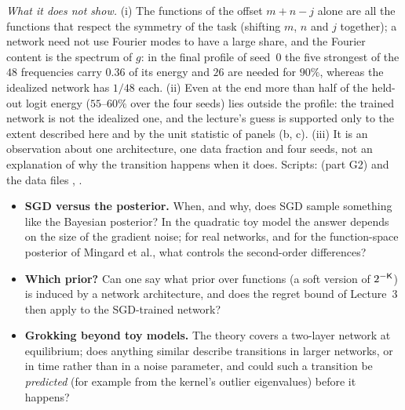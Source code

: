 \begin{beyond}
\emph{What it does not show.} (i) The functions of the offset $m+n-j$ alone are all the functions that respect the symmetry of the task (shifting $m$, $n$ and $j$ together); a network need not use Fourier modes to have a large share, and the Fourier content is the spectrum of $g$: in the final profile of seed~$0$ the five strongest of the $48$ frequencies carry $0.36$ of its energy and $26$ are needed for $90\%$, whereas the idealized network has $1/48$ each. (ii) Even at the end more than half of the held-out logit energy ($55$--$60\%$ over the four seeds) lies outside the profile: the trained network is not the idealized one, and the lecture's guess is supported only to the extent described here and by the unit statistic of panels (b, c). (iii) It is an observation about one architecture, one data fraction and four seeds, not an explanation of why the transition happens when it does. Scripts:  (part G2) and the data files , .
\end{beyond}

\begin{openq}
\begin{itemize}
  \item \textbf{SGD versus the posterior.} When, and why, does SGD sample something like the Bayesian posterior? In the quadratic toy model the answer depends on the size of the gradient noise; for real networks, and for the function-space posterior of Mingard et al., what controls the second-order differences?
  \item \textbf{Which prior?} Can one say what prior over functions (a soft version of $2^{-\mathsf{K}}$) is induced by a network architecture, and does the regret bound of Lecture~3 then apply to the SGD-trained network?
  \item \textbf{Grokking beyond toy models.} The theory covers a two-layer network at equilibrium; does anything similar describe transitions in larger networks, or in time rather than in a noise parameter, and could such a transition be \emph{predicted} (for example from the kernel's outlier eigenvalues) before it happens?
\end{itemize}
\end{openq}

